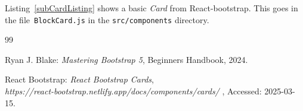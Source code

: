 \documentclass[12pt]{article}
\begin{document}
Listing~\ref{subCardListing} shows a basic {\em Card} from React-bootstrap.
This goes in~ the file~\lstinline[language=bash]|BlockCard.js| in the \lstinline[language=bash]|src/components| directory.




%
%
%
%
\begin {thebibliography}{99}
%



 Ryan J. Blake:
	      {\em Mastering Bootstrap 5},
	     Beginners Handbook,
       2024.

       
 React Bootstrap:
        {\em React Bootstrap Cards},\\
        {\em https://react-bootstrap.netlify.app/docs/components/cards/ },
       Accessed: 2025-03-15.

\end {thebibliography}
\end{document}
